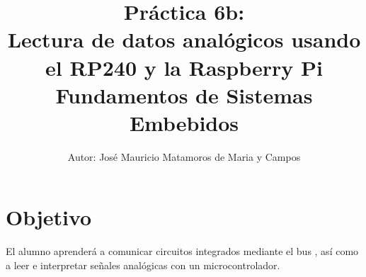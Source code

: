 \documentclass[letterpaper,10.5pt]{article}
\author{\footnotesize Autor: José Mauricio Matamoros de Maria y Campos}
\title{Práctica 6b:\\Lectura de datos analógicos usando el RP240 y la Raspberry Pi\\
{\large Fundamentos de Sistemas Embebidos}}
\date{}
\begin{document}
\maketitle

\section{Objetivo}%
\label{sec:objective}
El alumno aprenderá a comunicar circuitos integrados mediante el bus \IIC{},
así como a leer e interpretar señales analógicas con un microcontrolador.







\appendix


\end{document}
